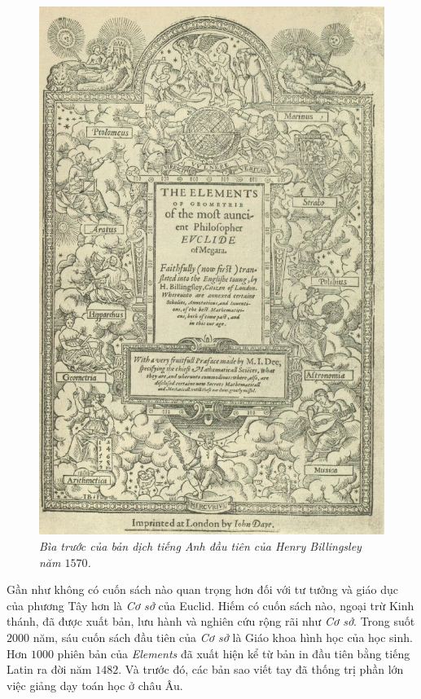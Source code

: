 \begin{multicols}{2}
\begin{figure}[H]
		\includegraphics[width= 1\linewidth]{3}
		\caption{\small\textit{\color{lichsutoanhoc}Bìa trước của bản dịch tiếng Anh đầu tiên của Henry Billingsley năm $1570$.}}
		\vspace*{-10pt}
		\end{figure} 
	Gần như không có cuốn sách nào quan trọng hơn đối với tư tưởng và giáo dục của phương Tây hơn là \textit{Cơ sở} của Euclid. Hiếm có cuốn sách nào, ngoại trừ Kinh thánh, đã được xuất bản, lưu hành và nghiên cứu rộng rãi như \textit{Cơ sở}. Trong suốt $2000$ năm, sáu cuốn sách đầu tiên của \textit{Cơ sở} là Giáo khoa hình học của học sinh. Hơn $1000$ phiên bản của \textit{Elements} đã xuất hiện kể từ bản in đầu tiên bằng tiếng Latin ra đời năm $1482$. Và trước đó, các bản sao viết tay đã thống trị phần lớn việc giảng dạy toán học ở châu Âu.

\end{multicols}
